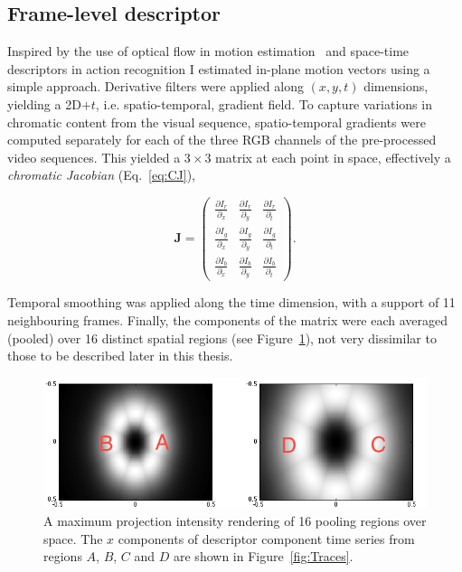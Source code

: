 \subsection{Frame-level descriptor}

Inspired by the use of optical flow in motion estimation~\citep{Weickert2006} and space-time descriptors in action recognition \citep{Wang2009} I estimated in-plane motion vectors using a simple approach.  Derivative filters were applied along $(x,y,t)$ dimensions, yielding a 2D$+t$, i.e. spatio-temporal, gradient field.  To capture variations in chromatic content from the visual sequence, spatio-temporal gradients were computed separately for each of the three RGB channels of the pre-processed video sequences.  This yielded a $3\times 3$ matrix at each point in space, effectively a \textit{chromatic Jacobian} (Eq.~\ref{eq:CJ}),	  

\begin{equation}
\mathbf{J} = \left (
\begin{array}{ccc}
\frac{\partial I_r}{\partial_x} & \frac{\partial I_r}{\partial_y}   & \frac{\partial I_r}{\partial_t} \\
\frac{\partial I_g}{\partial_x}   & \frac{\partial I_g}{\partial_y}  &  \frac{\partial I_g}{\partial_t} \\
\frac{\partial I_b}{\partial_x}  & \frac{\partial  I_b}{\partial_y}  &  \frac{\partial I_b}{\partial_t}
\end{array}
\right ).
\label{eq:CJ}
\end{equation}

Temporal smoothing was applied along the time dimension, with a support of 11 neighbouring frames. Finally, the components of the matrix were each averaged (pooled) over 16 distinct spatial regions (see Figure~\ref{fig:pooling4lwcolor}), not very dissimilar to those to be described later in this thesis. 



\begin{figure}[h!]
\centering
\includegraphics[width=\linewidth]{./gfx/Chapter04/pooling_lwcolor.png}
\caption{A maximum projection intensity rendering of 16 pooling regions over space. The $x$ components of descriptor component time series from regions $A$, $B$, $C$ and $D$ are shown in Figure~\ref{fig:Traces}.}
\label{fig:pooling4lwcolor}
\end{figure}


